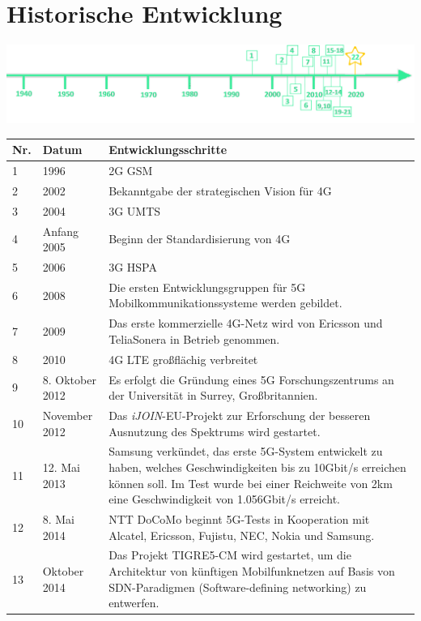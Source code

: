 \section*{Historische Entwicklung}
\includegraphics[width=\textwidth]{Kapitel/5G/Grafiken/Zeitstrahl2}
\par
\noindent
{}
\begin{tabular}{|p{1 cm}|p{3 cm}|p{13.55 cm}|}
	\hline
	Nr. & Datum & Entwicklungsschritte~\cite{5g.1}\\
	\hline
	1 & 1996 & 2G GSM \\
	\hline
	2 & 2002 & Bekanntgabe der strategischen Vision für 4G\cite{5g.5} \\
	\hline
	3 & 2004 & 3G UMTS\\
	\hline 
	4 & Anfang 2005 & Beginn der Standardisierung von 4G\cite{5g.5} \\
	\hline
	5 & 2006 & 3G HSPA\\
	\hline
	6 & 2008 & Die ersten Entwicklungsgruppen für 5G Mobilkommunikationssysteme werden gebildet.\\
	\hline
	7 & 2009 & Das erste kommerzielle 4G-Netz wird von Ericsson und TeliaSonera in Betrieb genommen. \\
	\hline
	8 & 2010 & 4G LTE großflächig verbreitet \\
	\hline
	9 & 8. Oktober 2012 & Es erfolgt die Gründung eines 5G Forschungszentrums an der Universität in Surrey, Großbritannien. \\
	\hline
	10 & November 2012 & Das \textit{iJOIN}-EU-Projekt zur Erforschung der besseren Ausnutzung des Spektrums wird gestartet. \\
	\hline
	11 & 12. Mai 2013 & Samsung verkündet, das erste 5G-System entwickelt zu haben, welches Geschwindigkeiten bis zu 10Gbit/s erreichen können soll. Im Test wurde bei einer Reichweite von 2km eine Geschwindigkeit von 1.056Gbit/s erreicht. \\
	\hline
	12 & 8. Mai 2014 & NTT DoCoMo beginnt 5G-Tests in Kooperation mit Alcatel, Ericsson, Fujistu, NEC, Nokia und Samsung. \\
	\hline
	13 & Oktober 2014 & Das Projekt TIGRE5-CM wird gestartet, um die Architektur von künftigen Mobilfunknetzen auf Basis von SDN-Paradigmen (Software-defining networking) zu entwerfen. \\

\end{tabular}
